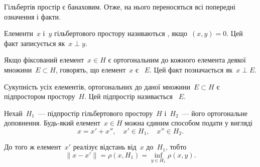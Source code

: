 Гільбертів простір є банаховим. Отже, на нього переносяться всі попередні означення і факти.

\begin{definition}
    Елементи~$x$ і~$y$ гільбертового простору називаються , якщо~$(x, y) = 0$. Цей факт записується як~$x \perp y$.
\end{definition}

\begin{definition}
    Якщо фіксований елемент~$x \in H$ є ортогональним до кожного елемента деякої множини~$E \subset H$, говорять, що елемент~$x$ є ~$E$. Цей факт позначається як~$x \perp E$.
\end{definition}

\begin{definition}
    Сукупність усіх елементів, ортогональних до даної множини~$E \subset H$ є підпростором простору~$H$. Цей підпростір називається ~$E$.
\end{definition}

\begin{theorem}[Релліха]
    Нехай~$H_1$~--- підпростір гільбертового простору~$H$ і~$H_2$~--- його ортогональне доповнення. Будь-який елемент~$x \in H$ можна єдиним способом подати у вигляді
    \begin{equation}
        \label{eq:16.5}
        x = x' + x'', \quad x' \in H_1, \quad x'' \in H_2.
    \end{equation}
    
    До того ж елемент~$x'$ реалізує відстань від~$x$ до~$H_1$, тобто
    \begin{equation*}
        \|x - x'\| = \rho(x, H_1) = \inf_{y \in H_1} \rho(x, y).
    \end{equation*}
\end{theorem}

